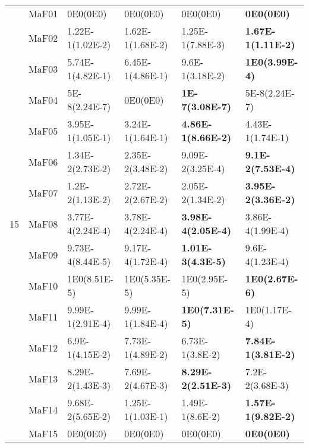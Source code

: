 \documentclass[]{article}
\begin{document}
\begin{table}
\begin{footnotesize}
\begin{tabular}{|l|l|l|l|l|l|}
\multirow{15}{*}{15} & MaF01 & \cellcolor{gray95} 0E0(0E0) & \cellcolor{gray95} 0E0(0E0) & \cellcolor{gray95} 0E0(0E0) & \cellcolor{gray95} {\bf 0E0(0E0)}\\
 & MaF02 & 1.22E-1(1.02E-2) & \cellcolor{gray95} 1.62E-1(1.68E-2) & 1.25E-1(7.88E-3) & \cellcolor{gray95} {\bf 1.67E-1(1.11E-2)}\\
 & MaF03 & 5.74E-1(4.82E-1) & \cellcolor{gray95} 6.45E-1(4.86E-1) & 9.6E-1(3.18E-2) & \cellcolor{gray95} {\bf 1E0(3.99E-4)}\\
 & MaF04 & \cellcolor{gray95} 5E-8(2.24E-7) & \cellcolor{gray95} 0E0(0E0) & \cellcolor{gray95} {\bf 1E-7(3.08E-7)} & \cellcolor{gray95} 5E-8(2.24E-7)\\
 & MaF05 & \cellcolor{gray95} 3.95E-1(1.05E-1) & 3.24E-1(1.64E-1) & \cellcolor{gray95} {\bf 4.86E-1(8.66E-2)} & \cellcolor{gray95} 4.43E-1(1.74E-1)\\
 & MaF06 & 1.34E-2(2.73E-2) & 2.35E-2(3.48E-2) & \cellcolor{gray95} 9.09E-2(3.25E-4) & \cellcolor{gray95} {\bf 9.1E-2(7.53E-4)}\\
 & MaF07 & 1.2E-2(1.13E-2) & \cellcolor{gray95} 2.72E-2(2.67E-2) & \cellcolor{gray95} 2.05E-2(1.34E-2) & \cellcolor{gray95} {\bf 3.95E-2(3.36E-2)}\\
 & MaF08 & \cellcolor{gray95} 3.77E-4(2.24E-4) & \cellcolor{gray95} 3.78E-4(2.24E-4) & \cellcolor{gray95} {\bf 3.98E-4(2.05E-4)} & \cellcolor{gray95} 3.86E-4(1.99E-4)\\
 & MaF09 & \cellcolor{gray95} 9.73E-4(8.44E-5) & \cellcolor{gray95} 9.17E-4(1.72E-4) & \cellcolor{gray95} {\bf 1.01E-3(4.3E-5)} & \cellcolor{gray95} 9.6E-4(1.23E-4)\\
 & MaF10 & 1E0(8.51E-5) & 1E0(5.35E-5) & 1E0(2.95E-5) & \cellcolor{gray95} {\bf 1E0(2.67E-6)}\\
 & MaF11 & 9.99E-1(2.91E-4) & 9.99E-1(1.84E-4) & \cellcolor{gray95} {\bf 1E0(7.31E-5)} & 1E0(1.17E-4)\\
 & MaF12 & 6.9E-1(4.15E-2) & \cellcolor{gray95} 7.73E-1(4.89E-2) & 6.73E-1(3.8E-2) & \cellcolor{gray95} {\bf 7.84E-1(3.81E-2)}\\
 & MaF13 & \cellcolor{gray95} 8.29E-2(1.43E-3) & 7.69E-2(4.67E-3) & \cellcolor{gray95} {\bf 8.29E-2(2.51E-3)} & 7.2E-2(3.68E-3)\\
 & MaF14 & \cellcolor{gray95} 9.68E-2(5.65E-2) & \cellcolor{gray95} 1.25E-1(1.03E-1) & \cellcolor{gray95} 1.49E-1(8.6E-2) & \cellcolor{gray95} {\bf 1.57E-1(9.82E-2)}\\
 & MaF15 & \cellcolor{gray95} 0E0(0E0) & \cellcolor{gray95} 0E0(0E0) & \cellcolor{gray95} 0E0(0E0) & \cellcolor{gray95} {\bf 0E0(0E0)}\\
\hline
\end{tabular}
\end{footnotesize}
\end{table}
\end{document}
